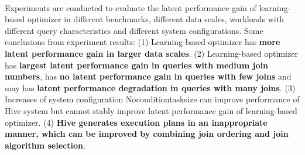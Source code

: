     \paragraph{}
    Experiments are conducted to evaluate the latent performance gain of learning-based optimizer in different benchmarks, different data scales, workloads with 
    different query characteristics and different system configurations. Some conclusions from experiment results: (1) Learning-based optimizer has \textbf{more latent
    performance gain in larger data scales}. (2) Learning-based optimizer has \textbf{largest latent performance gain in queries with medium join numbers}, has 
    \textbf{no latent performance gain in queries with few joins} and may has \textbf{latent performance degradation in queries with many joins}. (3) Increases of system configuration
    Noconditiontasksize can improve performance of Hive system but cannot stably improve latent performance gain of learning-based optimizer. (4) \textbf{Hive generates 
    execution plans in an inappropriate manner, which can be improved by combining join ordering and join algorithm selection}.
    
